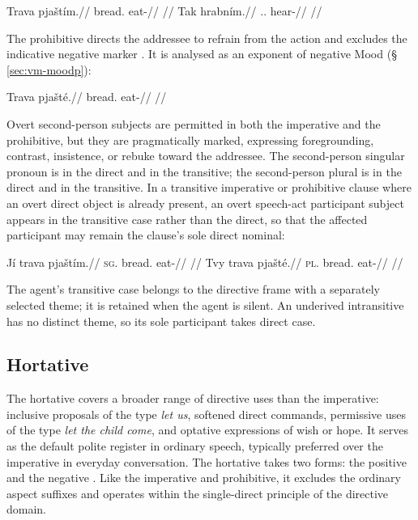 \pex
\a
\begingl
\gla Trava pjaštím.//
\glb bread.\Dir{} eat-\Imp{}//
\glft {}//
\endgl
\a
\begingl
\gla Tak hrabním.//
\glb \Dem{}.\Prox{}.\Dir{} hear-\Imp{}//
\glft {}//
\endgl
\xe

The prohibitive directs the addressee to refrain from the action and excludes
the indicative negative marker . It is analysed as an exponent of
negative Mood (§\,\ref{sec:vm-moodp}):

\pex
\a
\begingl
\gla Trava pjašté.//
\glb bread.\Dir{} eat-\Proh{}//
\glft {}//
\endgl
\xe

Overt second-person subjects are permitted in both the imperative and the
prohibitive, but they are pragmatically marked, expressing foregrounding,
contrast, insistence, or rebuke toward the addressee. The second-person singular
pronoun is  in the direct and  in the transitive; the
second-person plural is  in the direct and  in the
transitive. In a transitive imperative or prohibitive clause where an overt
direct object is already present, an overt speech-act participant subject
appears in the transitive case rather than the direct, so that the affected
participant may remain the clause's sole direct nominal:

\pex
\a
\begingl
\gla Jí trava pjaštím.//
\textsc{sg}.\Trs{} bread.\Dir{} eat-\Imp{}//
\glft {} //
\endgl
\a
\begingl
\gla Tvy trava pjašté.//
\textsc{pl}.\Trs{} bread.\Dir{} eat-\Proh{}//
\glft {} //
\endgl
\xe

\noindent The agent's transitive case belongs to the directive frame with a
separately selected theme; it is retained when the agent is silent. An
underived intransitive has no distinct theme, so its sole participant takes
direct case.

\subsection{Hortative}\label{sec:mood-hort}

The hortative covers a broader range of directive uses than the imperative:
inclusive proposals of the type \textit{let us}, softened direct commands,
permissive uses of the type \textit{let the child come}, and optative
expressions of wish or hope. It serves as the default polite register in
ordinary speech, typically preferred over the imperative in everyday
conversation. The hortative takes two forms: the positive  and the
negative . Like the imperative and prohibitive, it excludes the
ordinary aspect suffixes and operates within the single-direct principle of the
directive domain.

